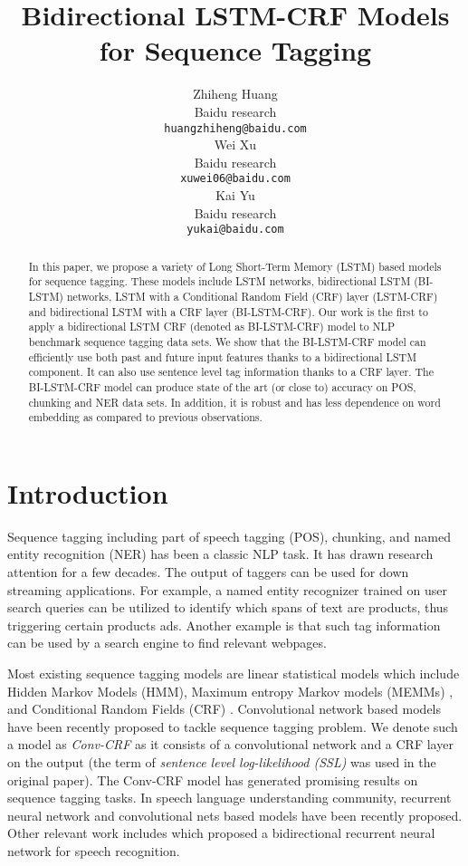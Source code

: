 \documentclass[11pt,a4paper]{article}
\title{Bidirectional LSTM-CRF Models for Sequence Tagging}
\author{Zhiheng Huang \\
  Baidu research \\
  {\tt huangzhiheng@baidu.com} \\\And
  Wei Xu \\
  Baidu research \\
  {\tt xuwei06@baidu.com}  \\\And
  Kai Yu \\
  Baidu research \\
  {\tt yukai@baidu.com} 
  \\}
\date{}
\begin{document}
\renewcommand\baselinestretch{0.90}
\normalbaselineskip

\maketitle
\begin{abstract}
In this paper, we propose a variety of  Long Short-Term Memory (LSTM) based models for sequence tagging. These models include LSTM networks, bidirectional LSTM (BI-LSTM) networks, LSTM with a Conditional Random Field (CRF) layer (LSTM-CRF) and bidirectional LSTM with a CRF layer (BI-LSTM-CRF).  Our work is the first to apply a bidirectional LSTM CRF (denoted as BI-LSTM-CRF) model to NLP benchmark sequence tagging data sets.  We show that the BI-LSTM-CRF model can efficiently use both past and future input features thanks to a bidirectional LSTM component. It can also use sentence level tag information thanks to a CRF layer. The BI-LSTM-CRF model can produce state of the art (or close to) accuracy on POS, chunking and NER data sets. In addition, it is robust and has less dependence on word embedding as compared to previous observations.
\end{abstract}

\section{Introduction}

Sequence tagging including part of speech tagging (POS), chunking, and named entity recognition (NER) has been a classic NLP task.  It has drawn research attention for a few decades. The output of taggers can be used for down streaming applications. For example, a named entity recognizer trained on user search queries can be utilized to identify which spans of text are products, thus triggering certain products ads. Another example is that such tag information can be used by a search engine to find relevant webpages. 

Most existing sequence tagging models are linear statistical models which include Hidden Markov Models (HMM), Maximum entropy Markov models (MEMMs) \cite{mcCallum1}, and Conditional Random Fields (CRF) \cite{lafferty1}. Convolutional network based models \cite{collobert1} have been recently proposed to tackle sequence tagging problem. We denote such a model as \textit{Conv-CRF}  as it consists of a convolutional network and a CRF layer on the output (the term of \textit{sentence level log-likelihood (SSL)} was used in the original paper). The Conv-CRF model has generated promising results on sequence tagging tasks. In speech language understanding community, recurrent neural network \cite{mesnil1,yao1} and convolutional nets \cite{xu1} based models have been recently proposed. Other relevant work includes \cite{graves1,graves3} which proposed a bidirectional recurrent neural network for speech recognition.
\end{document}
